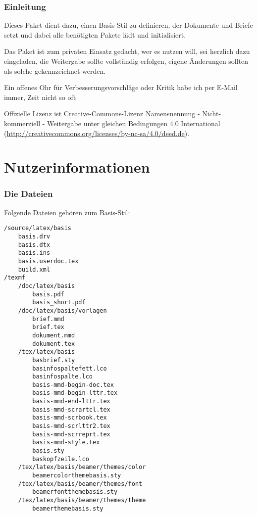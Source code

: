 
\section{Einleitung}

Dieses Paket dient dazu, einen Basis-Stil zu definieren, der Dokumente und Briefe setzt und dabei alle benötigten Pakete lädt und initialisiert.

Das Paket ist zum privaten Einsatz gedacht, wer es nutzen will, sei herzlich dazu eingeladen, die Weitergabe sollte vollständig erfolgen, eigene Änderungen sollten als solche gekennzeichnet werden.

Ein offenes Ohr für Verbesserungsvorschläge oder Kritik habe ich per E-Mail immer, Zeit nicht so oft \smiley

Offizielle Lizenz ist Creative-Commons-Lizenz Namensnennung - Nicht-kommerziell - Weitergabe unter gleichen Bedingungen 4.0 International (\url{http://creativecommons.org/licenses/by-nc-sa/4.0/deed.de}).


\cleardoublepage
\thispagestyle{BASfuss}
\part{Nutzerinformationen}
\cleardoublepage


\section{Die Dateien}
\label{sec:Dateien}

Folgende Dateien gehören zum Basis-Stil:
{\small
\begin{verbatim}
/source/latex/basis
	basis.drv
	basis.dtx
	basis.ins
	basis.userdoc.tex
	build.xml
/texmf
	/doc/latex/basis
		basis.pdf
		basis_short.pdf
	/doc/latex/basis/vorlagen
		brief.mmd
		brief.tex
		dokument.mmd
		dokument.tex
	/tex/latex/basis
		basbrief.sty
		basinfospaltefett.lco
		basinfospalte.lco
		basis-mmd-begin-doc.tex
		basis-mmd-begin-lttr.tex
		basis-mmd-end-lttr.tex
		basis-mmd-scrartcl.tex
		basis-mmd-scrbook.tex
		basis-mmd-scrlttr2.tex
		basis-mmd-scrreprt.tex
		basis-mmd-style.tex
		basis.sty
		baskopfzeile.lco
	/tex/latex/basis/beamer/themes/color
		beamercolorthemebasis.sty
	/tex/latex/basis/beamer/themes/font
		beamerfontthemebasis.sty
	/tex/latex/basis/beamer/themes/theme
		beamerthemebasis.sty
\end{verbatim}
}


